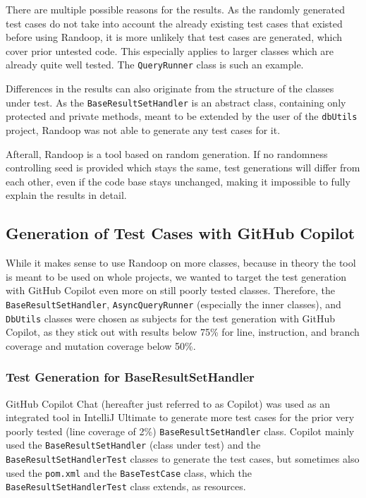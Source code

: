 \documentclass[sigconf]{acmart}
\begin{document}
There are multiple possible reasons for the results. As the randomly generated test cases do not take into account the already existing test cases that existed before using Randoop, it is more unlikely that test cases are generated, which cover prior untested code. This especially applies to larger classes which are already quite well tested. The \texttt{QueryRunner} class is such an example.

Differences in the results can also originate from the structure of the classes under test. As the \texttt{BaseResultSetHandler} is an abstract class, containing only protected and private methods, meant to be extended by the user of the \texttt{dbUtils} project, Randoop was not able to generate any test cases for it.

Afterall, Randoop is a tool based on random generation. If no randomness controlling seed is provided which stays the same, test generations will differ from each other, even if the code base stays unchanged, making it impossible to fully explain the results in detail.

\subsection*{Generation of Test Cases with GitHub Copilot}

While it makes sense to use Randoop on more classes, because in theory the tool is meant to be used on whole projects, we wanted to target the test generation with GitHub Copilot even more on still poorly tested classes. Therefore, the \texttt{BaseResultSetHandler}, \texttt{AsyncQueryRunner} (especially the inner classes), and \texttt{DbUtils} classes were chosen as subjects for the test generation with GitHub Copilot, as they stick out with results below 75\% for line, instruction, and branch coverage and mutation coverage below 50\%.

\subsubsection*{\textbf{Test Generation for BaseResultSetHandler}}

GitHub Copilot Chat (hereafter just referred to as Copilot) was used as an integrated tool in IntelliJ Ultimate to generate more test cases for the prior very poorly tested (line coverage of 2\%) \texttt{BaseResultSetHandler} class. Copilot mainly used the \texttt{BaseResultSetHandler} (class under test) and the \texttt{BaseResultSetHandlerTest} classes to generate the test cases, but sometimes also used the \texttt{pom.xml} and the \texttt{BaseTestCase} class, which the \texttt{BaseResultSetHandlerTest} class extends, as resources.
\end{document}

